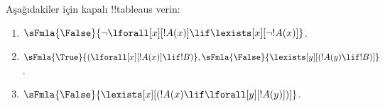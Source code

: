 \begin{prob}
Aşağıdakiler için kapalı !!{tableau}s verin:
\begin{enumerate}
\item $\sFmla{\False}{\lnot\lforall[x][!A(x)] \lif \lexists[x][\lnot!A(x)]}$.
\item $\sFmla{\True}{(\lforall[x][!A(x)] \lif !B)}, \sFmla{\False}{\lexists[y][(!A(y) \lif !B)]}$.
\item $\sFmla{\False}{\lexists[x][(!A(x) \lif \lforall[y][!A(y)])]}$.
\end{enumerate}
\end{prob}

